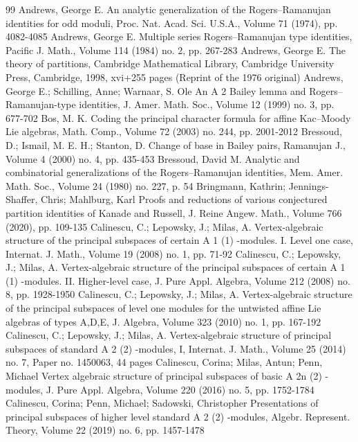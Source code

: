 \documentclass[10pt]{article}
\begin{document}
\begin{thebibliography}{99}
Andrews, George E. An analytic generalization of the Rogers–Ramanujan identities for odd moduli, Proc. Nat. Acad. Sci. U.S.A., Volume 71 (1974), pp. 4082-4085
Andrews, George E. Multiple series Rogers–Ramanujan type identities, Pacific J. Math., Volume 114 (1984) no. 2, pp. 267-283
Andrews, George E. The theory of partitions, Cambridge Mathematical Library, Cambridge University Press, Cambridge, 1998, xvi+255 pages (Reprint of the 1976 original)
Andrews, George E.; Schilling, Anne; Warnaar, S. Ole An A 2  Bailey lemma and Rogers–Ramanujan-type identities, J. Amer. Math. Soc., Volume 12 (1999) no. 3, pp. 677-702
Bos, M. K. Coding the principal character formula for affine Kac–Moody Lie algebras, Math. Comp., Volume 72 (2003) no. 244, pp. 2001-2012
Bressoud, D.; Ismail, M. E. H.; Stanton, D. Change of base in Bailey pairs, Ramanujan J., Volume 4 (2000) no. 4, pp. 435-453
Bressoud, David M. Analytic and combinatorial generalizations of the Rogers–Ramanujan identities, Mem. Amer. Math. Soc., Volume 24 (1980) no. 227, p. 54
Bringmann, Kathrin; Jennings-Shaffer, Chris; Mahlburg, Karl Proofs and reductions of various conjectured partition identities of Kanade and Russell, J. Reine Angew. Math., Volume 766 (2020), pp. 109-135
Calinescu, C.; Lepowsky, J.; Milas, A. Vertex-algebraic structure of the principal subspaces of certain A 1 (1) -modules. I. Level one case, Internat. J. Math., Volume 19 (2008) no. 1, pp. 71-92
Calinescu, C.; Lepowsky, J.; Milas, A. Vertex-algebraic structure of the principal subspaces of certain A 1 (1) -modules. II. Higher-level case, J. Pure Appl. Algebra, Volume 212 (2008) no. 8, pp. 1928-1950
Calinescu, C.; Lepowsky, J.; Milas, A. Vertex-algebraic structure of the principal subspaces of level one modules for the untwisted affine Lie algebras of types A,D,E, J. Algebra, Volume 323 (2010) no. 1, pp. 167-192
Calinescu, C.; Lepowsky, J.; Milas, A. Vertex-algebraic structure of principal subspaces of standard A 2 (2) -modules, I, Internat. J. Math., Volume 25 (2014) no. 7, Paper no. 1450063, 44 pages
Calinescu, Corina; Milas, Antun; Penn, Michael Vertex algebraic structure of principal subspaces of basic A 2n (2) -modules, J. Pure Appl. Algebra, Volume 220 (2016) no. 5, pp. 1752-1784
Calinescu, Corina; Penn, Michael; Sadowski, Christopher Presentations of principal subspaces of higher level standard A 2 (2) -modules, Algebr. Represent. Theory, Volume 22 (2019) no. 6, pp. 1457-1478

\end{thebibliography}
\end{document}
